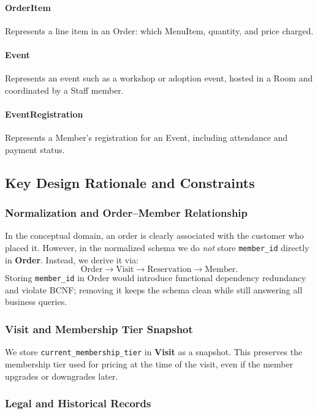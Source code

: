 \documentclass[11pt]{article}
\begin{document}
\paragraph{OrderItem}
Represents a line item in an Order: which MenuItem, quantity, and price charged.

\paragraph{Event}
Represents an event such as a workshop or adoption event, hosted in a Room
and coordinated by a Staff member.

\paragraph{EventRegistration}
Represents a Member's registration for an Event, including attendance and payment status.

\subsection{Key Design Rationale and Constraints}

\subsubsection{Normalization and Order--Member Relationship}

In the conceptual domain, an order is clearly associated with the customer who
placed it. However, in the normalized schema we do \emph{not} store \texttt{member\_id}
directly in \textbf{Order}. Instead, we derive it via:
\[
    \text{Order} \rightarrow \text{Visit} \rightarrow \text{Reservation} \rightarrow \text{Member}.
\]
Storing \texttt{member\_id} in Order would introduce functional dependency redundancy
and violate BCNF; removing it keeps the schema clean while still answering all
business queries.

\subsubsection{Visit and Membership Tier Snapshot}

We store \texttt{current\_membership\_tier} in \textbf{Visit} as a snapshot.
This preserves the membership tier used for pricing at the time of the visit,
even if the member upgrades or downgrades later.

\subsubsection{Legal and Historical Records}
\end{document}
